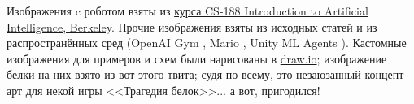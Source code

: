 Изображения c роботом взяты из \href{https://inst.eecs.berkeley.edu/~cs188/fa20/}{курса CS-188 Introduction to Artificial Intelligence, Berkeley}. Прочие изображения взяты из исходных статей и из распространённых сред (OpenAI Gym \cite{brockman2016openai}, Mario \cite{gym-super-mario-bros}, Unity ML Agents \cite{juliani2018unity}). Кастомные изображения для примеров и схем были нарисованы в \href{https://www.draw.io/}{draw.io}; изображение белки на них взято из \href{https://twitter.com/racefornuts/status/690043558208913408}{вот этого твита}; судя по всему, это незаюзанный концепт-арт для некой игры <<Трагедия белок>>... а вот, пригодился!


